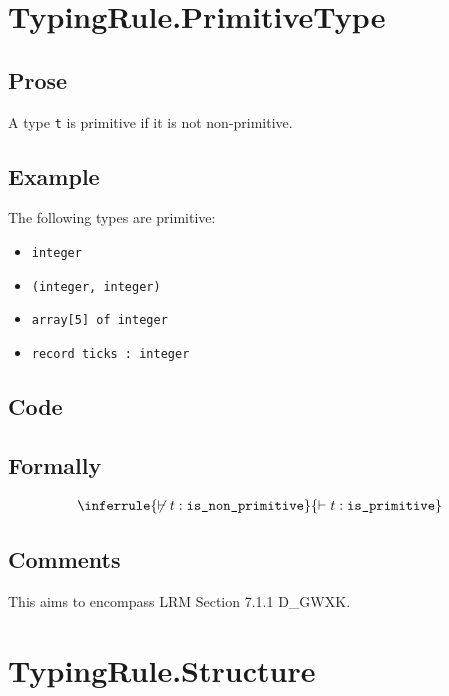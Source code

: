\documentclass{book}
\newcommand\isnonprimitive[0]{\texttt{is\_non\_primitive}}
\newcommand\isprimitive[0]{\texttt{is\_primitive}}
\begin{document}
\section{TypingRule.PrimitiveType}

    \subsection{Prose}
    A type \texttt{t} is primitive if it is not non-primitive.

    \subsection{Example}
The following types are primitive:
\begin{itemize}
\item \texttt{integer}
\item \texttt{(integer, integer)}
\item \texttt{array[5] of integer}
\item \texttt{record {ticks : integer}}
\end{itemize}

    \subsection{Code}

\begin{formal}
  \subsection{Formally}
\[
\begin{array}{c}
\inferrule{\not\entails t : \isnonprimitive}{\entails t : \isprimitive}
\end{array}
\]
\end{formal}

    \subsection{Comments}
    This aims to encompass LRM Section 7.1.1 D\_GWXK.

\section{TypingRule.Structure}
\end{document}
